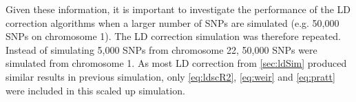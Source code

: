 	Given these information, it is important to investigate the performance of the \gls{LD} correction algorithms when a larger number of \glspl{SNP} are simulated (e.g. 50,000 \glspl{SNP} on chromosome 1).
	The \gls{LD} correction simulation was therefore repeated.
	Instead of simulating 5,000 \glspl{SNP} from chromosome 22, 50,000 \glspl{SNP} were simulated from chromosome 1. 
	As most \gls{LD} correction from \cref{sec:ldSim} produced similar results in previous simulation, only \cref{eq:ldscR2}, \cref{eq:weir} and \cref{eq:pratt} were included in this scaled up simulation.
	\begin{figure}[t]
		\centering
\end{figure}
